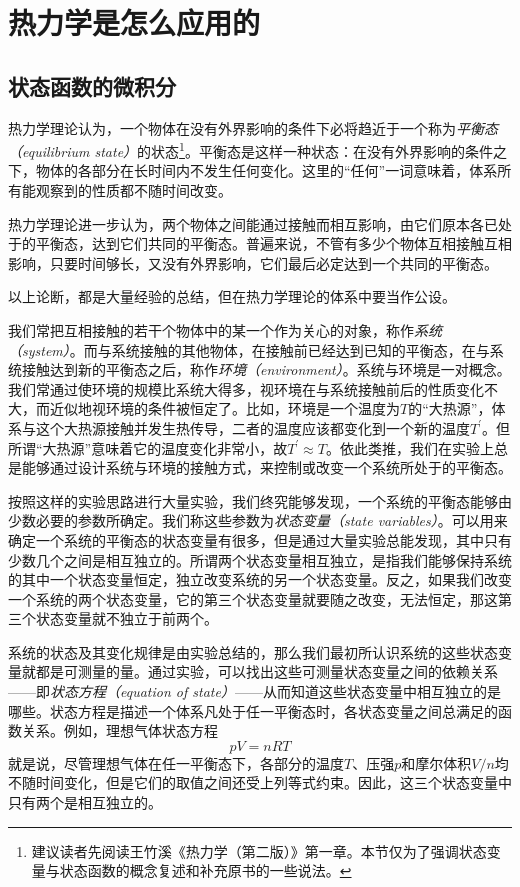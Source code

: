 \documentclass[main.tex]{subfiles}
\begin{document}
\section{热力学是怎么应用的}\label{I.2 pratical_thermodynamics}
\subsection{状态函数的微积分}
热力学理论认为，一个物体在没有外界影响的条件下必将趋近于一个称为\emph{平衡态（equilibrium state）}的状态\footnote{建议读者先阅读王竹溪《热力学（第二版）》第一章。本节仅为了强调状态变量与状态函数的概念复述和补充原书的一些说法。}。平衡态是这样一种状态：在没有外界影响的条件之下，物体的各部分在长时间内不发生任何变化。这里的“任何”一词意味着，体系所有能观察到的性质都不随时间改变。

热力学理论进一步认为，两个物体之间能通过接触而相互影响，由它们原本各已处于的平衡态，达到它们共同的平衡态。普遍来说，不管有多少个物体互相接触互相影响，只要时间够长，又没有外界影响，它们最后必定达到一个共同的平衡态。

以上论断，都是大量经验的总结，但在热力学理论的体系中要当作公设。

我们常把互相接触的若干个物体中的某一个作为关心的对象，称作\emph{系统（system）}。而与系统接触的其他物体，在接触前已经达到已知的平衡态，在与系统接触达到新的平衡态之后，称作\emph{环境（environment）}。系统与环境是一对概念。我们常通过使环境的规模比系统大得多，视环境在与系统接触前后的性质变化不大，而近似地视环境的条件被恒定了。比如，环境是一个温度为$T$的“大热源”，体系与这个大热源接触并发生热传导，二者的温度应该都变化到一个新的温度$T^\prime$。但所谓“大热源”意味着它的温度变化非常小，故$T^\prime\approx T$。依此类推，我们在实验上总是能够通过设计系统与环境的接触方式，来控制或改变一个系统所处于的平衡态。

按照这样的实验思路进行大量实验，我们终究能够发现，一个系统的平衡态能够由少数必要的参数所确定。我们称这些参数为\emph{状态变量（state variables）}。可以用来确定一个系统的平衡态的状态变量有很多，但是通过大量实验总能发现，其中只有少数几个之间是相互独立的。所谓两个状态变量相互独立，是指我们能够保持系统的其中一个状态变量恒定，独立改变系统的另一个状态变量。反之，如果我们改变一个系统的两个状态变量，它的第三个状态变量就要随之改变，无法恒定，那这第三个状态变量就不独立于前两个。

系统的状态及其变化规律是由实验总结的，那么我们最初所认识系统的这些状态变量就都是可测量的量。通过实验，可以找出这些可测量状态变量之间的依赖关系——即\emph{状态方程（equation of state）}——从而知道这些状态变量中相互独立的是哪些。状态方程是描述一个体系凡处于任一平衡态时，各状态变量之间总满足的函数关系。例如，理想气体状态方程
\[pV=nRT\]
就是说，尽管理想气体在任一平衡态下，各部分的温度$T$、压强$p$和摩尔体积$V/n$均不随时间变化，但是它们的取值之间还受上列等式约束。因此，这三个状态变量中只有两个是相互独立的。
\end{document}

